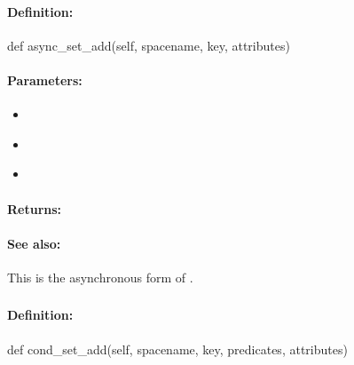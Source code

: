 \paragraph{Definition:}
\begin{pythoncode}
def async_set_add(self, spacename, key, attributes)
\end{pythoncode}

\paragraph{Parameters:}
\begin{itemize}[noitemsep]
\item {}\\

\item {}\\

\item {}\\

\end{itemize}

\paragraph{Returns:}


\paragraph{See also:}  This is the asynchronous form of .

\pagebreak
\subsubsection{}
\label{api:python:cond_set_add}


\paragraph{Definition:}
\begin{pythoncode}
def cond_set_add(self, spacename, key, predicates, attributes)
\end{pythoncode}

